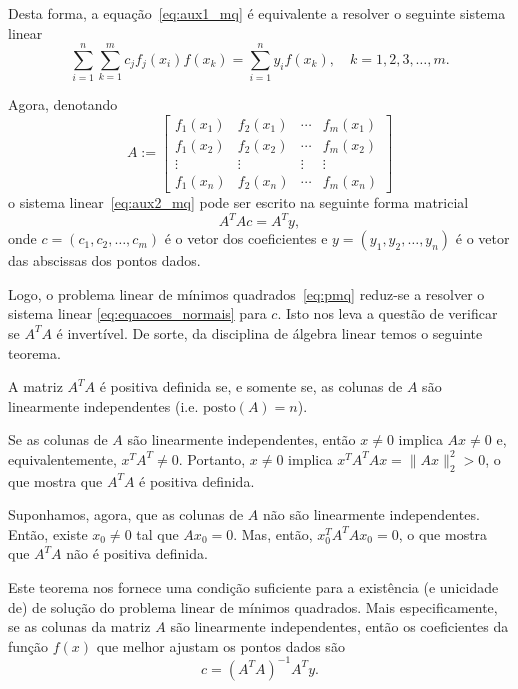Desta forma, a equação~\eqref{eq:aux1_mq} é equivalente a resolver o seguinte sistema linear
\begin{equation}\label{eq:aux2_mq}
  \sum_{i=1}^n\sum_{k=1}^m c_jf_j(x_i)f(x_k) = \sum_{i=1}^n y_if(x_k),\quad k=1, 2, 3, \dotsc, m.
\end{equation}

Agora, denotando
\begin{equation}
  A :=
  \begin{bmatrix}
    f_1(x_1) & f_2(x_1) & \cdots & f_m(x_1) \\
    f_1(x_2) & f_2(x_2) & \cdots & f_m(x_2) \\
    \vdots & \vdots & \vdots & \vdots \\
    f_1(x_n) & f_2(x_n) & \cdots & f_m(x_n)
  \end{bmatrix}
\end{equation}
o sistema linear~\eqref{eq:aux2_mq} pode ser escrito na seguinte forma matricial
\begin{equation}\label{eq:equacoes_normais}
  A^TAc= A^Ty,
\end{equation}
onde $c = (c_1, c_2, \dotsc, c_m)$ é o vetor dos coeficientes e $y = (y_1, y_2, \dotsc, y_n)$ é o vetor das abscissas dos pontos dados.

Logo, o problema linear de mínimos quadrados~\eqref{eq:pmq} reduz-se a resolver o sistema linear \eqref{eq:equacoes_normais} para $c$. Isto nos leva a questão de verificar se $A^TA$ é invertível. De sorte, da disciplina de álgebra linear temos o seguinte teorema.

\begin{teo}
  A matriz $A^TA$ é positiva definida se, e somente se, as colunas de $A$ são linearmente independentes (i.e. $\text{posto}(A)=n$).
\end{teo}
\begin{dem}
  Se as colunas de $A$ são linearmente independentes, então $x\neq 0$ implica $Ax\neq 0$ e, equivalentemente, $x^TA^T\neq 0$. Portanto, $x\neq 0$ implica $x^TA^TAx = \|Ax\|_2^2 > 0$, o que mostra que $A^TA$ é positiva definida.

  Suponhamos, agora, que as colunas de $A$ não são linearmente independentes. Então, existe $x_0\neq 0$ tal que $Ax_0 = 0$. Mas, então, $x_0^TA^TAx_0=0$, o que mostra que $A^TA$ não é positiva definida. 
\end{dem}

Este teorema nos fornece uma condição suficiente para a existência (e unicidade de) de solução do problema linear de mínimos quadrados. Mais especificamente, se as colunas da matriz $A$ são linearmente independentes, então os coeficientes da função $f(x)$ que melhor ajustam os pontos dados são
\begin{equation}
  c = (A^TA)^{-1}A^Ty.
\end{equation}


